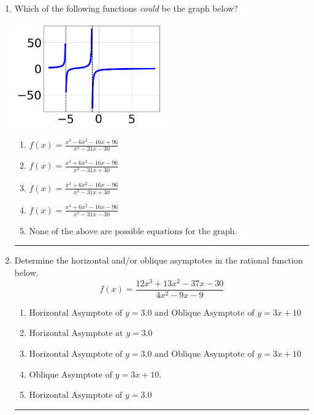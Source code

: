 \documentclass[14pt]{extbook}
\newcommand{\litem}[1]{\item#1\hspace*{-1cm}\rule{\textwidth}{0.4pt}}
\begin{document}
\begin{enumerate}
{\begin{enumerate}[label=\Alph*.]
\end{enumerate} }
\litem{
Which of the following functions \textit{could} be the graph below?
\begin{center}
    \includegraphics[width=0.5\textwidth]{../Figures/identifyGraphOfRationalFunctionC.png}
\end{center}
\begin{enumerate}[label=\Alph*.]
\item \( f(x)=\frac{x^{3} -6 x^{2} -16 x + 96}{x^{3} -31 x -30} \)
\item \( f(x)=\frac{x^{3} +6 x^{2} -16 x -96}{x^{3} -31 x + 30} \)
\item \( f(x)=\frac{x^{3} +6 x^{2} -16 x -96}{x^{3} -31 x + 30} \)
\item \( f(x)=\frac{x^{3} +6 x^{2} -16 x -96}{x^{3} -31 x -30} \)
\item \( \text{None of the above are possible equations for the graph.} \)

\end{enumerate} }
\litem{
Determine the horizontal and/or oblique asymptotes in the rational function below.\[ f(x) = \frac{12x^{3} +13 x^{2} -37 x -30}{4x^{2} -9 x -9} \]\begin{enumerate}[label=\Alph*.]
\item \( \text{Horizontal Asymptote of } y = 3.0 \text{ and Oblique Asymptote of } y = 3x + 10 \)
\item \( \text{Horizontal Asymptote at } y = 3.0 \)
\item \( \text{Horizontal Asymptote of } y = 3.0 \text{ and Oblique Asymptote of } y = 3x + 10 \)
\item \( \text{Oblique Asymptote of } y = 3x + 10. \)
\item \( \text{Horizontal Asymptote of } y = 3.0  \)


\end{enumerate}}
\end{enumerate}
\end{document}
